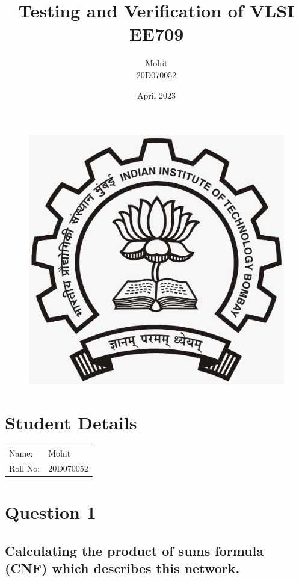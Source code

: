 \documentclass[12pt]{article}
\title{Testing and Verification of VLSI\\EE709}
\author{Mohit\\20D070052 }
\date{April 2023}
\begin{document}
\maketitle
\begin{figure}[H]
\begin{center}
\includegraphics[scale = 0.2]{LOGO.jpeg}
\end{center}
\end{figure}
\section{Student Details}
\begin{tabular}{ l l  }
 Name: & Mohit \\ 
 Roll No: & 20D070052  \\  
\end{tabular}

\section{Question 1}


\subsection{Calculating the product of sums formula (CNF) which describes this network.}
\end{document}
